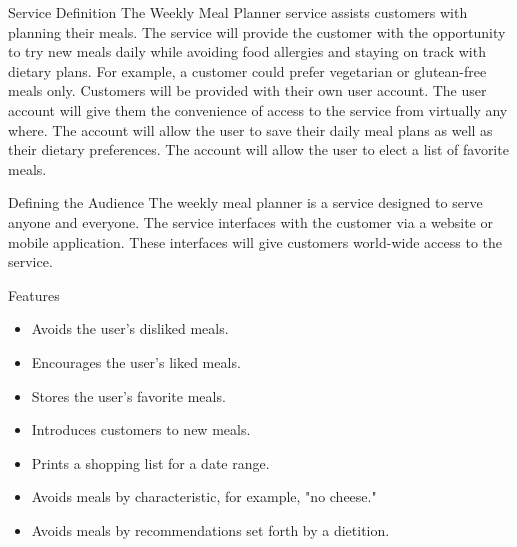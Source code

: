 \documentclass[a4paper,10pt,toc=graduated]{article}
\begin{document}
\begin{mySubsection}{Service Definition}
The Weekly Meal Planner service assists customers with planning their meals.
The service will provide the customer with
the opportunity to try new meals daily
while avoiding food allergies
and staying on track with dietary plans.
For example, a customer could prefer vegetarian or glutean-free meals only.
Customers will be provided with their own user account.
The user account will give them the convenience of access to the service
from virtually any where.
The account will allow the user to save their daily meal plans
as well as their dietary preferences.
The account will allow the user to elect a list of favorite meals.
\end{mySubsection}
\begin{mySubsection}{Defining the Audience}
\noindent
The weekly meal planner is a service designed to serve anyone and everyone.
The service interfaces with the customer via a website or mobile application.
These interfaces will give customers world-wide access to the service.
\newline
\end{mySubsection}

\begin{mySubsection}{Features}
\begin{itemize}
\item Avoids the user's disliked meals.
\item Encourages the user's liked meals.
\item Stores the user's favorite meals.
\item Introduces customers to new meals.
\item Prints a shopping list for a date range.
\item Avoids meals by characteristic, for example, "no cheese."
\item Avoids meals by recommendations set forth by a dietition.
\end{itemize}
\end{mySubsection}
\end{document}
